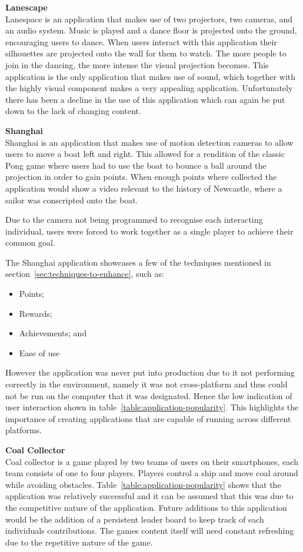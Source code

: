 \documentclass[a4paper,12pt]{article}
\begin{document}
\par
\textbf{Lanescape}\\
Lanespace is an application that makes use of two projectors, two cameras, and an audio system.
Music is played and a dance floor is projected onto the ground, encouraging users to dance.
When users interact with this application their silhouettes are projected onto the wall for them to watch.
The more people to join in the dancing, the more intense the visual projection becomes. 
This application is the only application that makes use of sound, which together with the highly visual component makes a very appealing application. 
Unfortunately there has been a decline in the use of this application which can again be put down to the lack of changing content. 

\par\textbf{Shanghai}\\
Shanghai is an application that makes use of motion detection cameras to allow users to move a boat left and right.
This allowed for a rendition of the classic Pong game where users had to use the boat to bounce a ball around the projection in order to gain points.
When enough points where collected the application would show a video relevant to the history of Newcastle, where a sailor was conscripted onto the boat.

Due to the camera not being programmed to recognise each interacting individual, users were forced to work together as a single player to achieve their common goal.

The Shanghai application showcases a few of the techniques mentioned in section~\ref{sec:techniques-to-enhance}, such as:
\begin{itemize}
	\item{Points;}
	\item{Rewards;}
	\item{Achievements; and}
	\item{Ease of use}
\end{itemize}
However the application was never put into production due to it not performing correctly in the environment, namely it was not cross-platform and thus could not be run on the computer that it was designated. Hence the low indication of user interaction shown in table~\ref{table:application-popularity}.
This highlights the importance of creating applications that are capable of running across different platforms.

\par\textbf{Coal Collector}\\
Coal collector is a game played by two teams of users on their smartphones, each team consists of one to four players. 
Players control a ship and move coal around while avoiding obstacles.
Table~\ref{table:application-popularity} shows that the application was relatively successful and it can be assumed that this was due to the competitive nature of the application.
Future additions to this application would be the addition of a persistent leader board to keep track of each individuals contributions. 
The games content itself will need constant refreshing due to the repetitive nature of the game.
\end{document}
